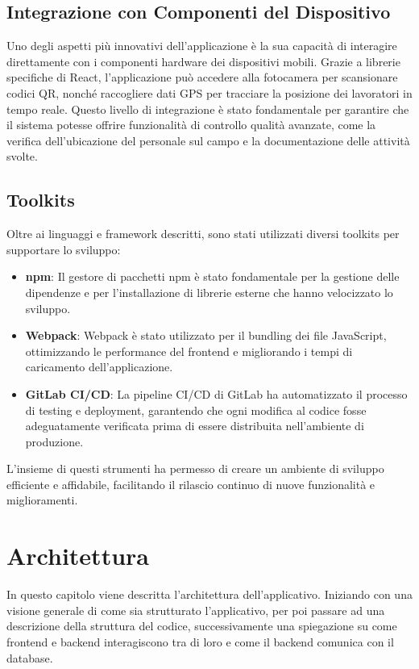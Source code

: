 \documentclass[twoside]{supsistudent}
\begin{document}
\section{Integrazione con Componenti del Dispositivo}

Uno degli aspetti più innovativi dell'applicazione è la sua capacità di interagire direttamente con i componenti hardware dei dispositivi mobili. Grazie a librerie specifiche di React, l'applicazione può accedere alla fotocamera per scansionare codici QR, nonché raccogliere dati GPS per tracciare la posizione dei lavoratori in tempo reale. Questo livello di integrazione è stato fondamentale per garantire che il sistema potesse offrire funzionalità di controllo qualità avanzate, come la verifica dell'ubicazione del personale sul campo e la documentazione delle attività svolte.

\section{Toolkits}

Oltre ai linguaggi e framework descritti, sono stati utilizzati diversi toolkits per supportare lo sviluppo:

\begin{itemize}
  \item \textbf{npm}: Il gestore di pacchetti npm è stato fondamentale per la gestione delle dipendenze e per l'installazione di librerie esterne che hanno velocizzato lo sviluppo.
  \item \textbf{Webpack}: Webpack è stato utilizzato per il bundling dei file JavaScript, ottimizzando le performance del frontend e migliorando i tempi di caricamento dell'applicazione.
  \item \textbf{GitLab CI/CD}: La pipeline CI/CD di GitLab ha automatizzato il processo di testing e deployment, garantendo che ogni modifica al codice fosse adeguatamente verificata prima di essere distribuita nell'ambiente di produzione.
\end{itemize}

L'insieme di questi strumenti ha permesso di creare un ambiente di sviluppo efficiente e affidabile, facilitando il rilascio continuo di nuove funzionalità e miglioramenti.

\chapter{Architettura}

In questo capitolo viene descritta l’architettura dell’applicativo. Iniziando con una visione generale di come sia strutturato l’applicativo, per poi passare ad una descrizione della struttura del codice, successivamente una spiegazione su come frontend e backend interagiscono tra di loro e come il backend comunica con il database.
\end{document}
